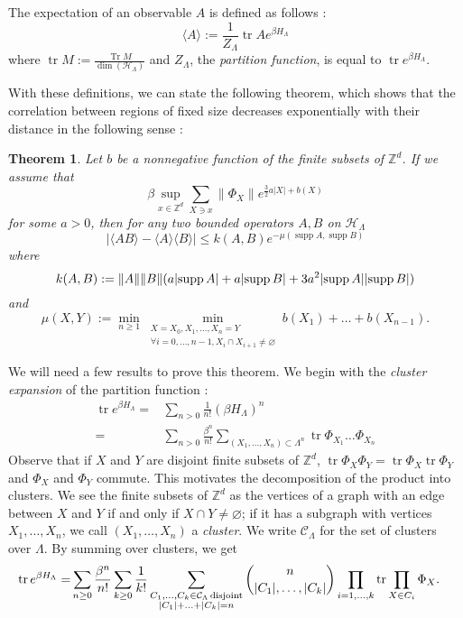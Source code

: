 \documentclass[french]{article}
\DeclarePairedDelimiter\abs{\lvert}{\rvert}
\newtheorem{thm}{Theorem}
\DeclareMathOperator{\Tr}{Tr}
\DeclareMathOperator{\disj}{disjoint}
\DeclareMathOperator{\tr}{tr}
\DeclareMathOperator{\supp}{supp}
\begin{document}
 The expectation of an observable $A$ is defined as follows :
 $$
 \langle A \rangle := \frac{1}{Z_\Lambda}\tr Ae^{\beta H_\Lambda}
 $$
 where $\tr M:=\frac{\Tr M}{\dim(\mathcal H_\Lambda)}$ and $Z_\Lambda$, the {\it partition function}, is equal to $\tr e^{\beta H_\Lambda}$.
 
 With these definitions, we can state the following theorem, which shows that the correlation between regions of fixed size decreases exponentially with their distance in the following sense :
 \begin{thm}
     \label{thm:exp_decay_of_correlations}
     Let $b$ be a nonnegative function of the finite subsets of $\mathbb Z^d$.
     If we assume that 
     $$\beta\sup_{x\in\mathbb Z^d}\sum_{X\ni x}\lVert\Phi_X\rVert e^{\frac{3}{2}a|X|+b(X)}$$ 
     for some $a>0$, then for any two bounded operators $A,B$ on $\mathcal H_\Lambda$
     $$|\langle AB\rangle - \langle A\rangle\langle B\rangle|\leq k(A,B)e^{-\mu(\supp A,\supp B)}$$
     where $$k(A,B):=\lVert A\rVert\lVert B\rVert(a\abs{\supp A}+a\abs{\supp B} + 3a^2\abs{\supp A}\abs{\supp B})$$ and 
     $$
     \mu(X,Y):= \min_{n\geq 1} \min_{\substack{X=X_0,X_1,\ldots,X_n=Y \\ \forall i=0,\ldots,n-1, X_i\cap X_{i+1}\neq \varnothing}} b(X_1)+\ldots+b(X_{n-1}).
     $$
 \end{thm}
    We will need a few results to prove this theorem.
     We begin with the {\it cluster expansion} of the partition function :
     \begin{align*}
         \tr e^{\beta H_\Lambda}=&\sum_{n>0}\frac{1}{n!}(\beta H_\Lambda)^n\\
         =&\sum_{n>0}\frac{\beta^n}{n!}\sum_{(X_1,\ldots, X_n)\subset \Lambda^n}\tr\Phi_{X_1}\ldots\Phi_{X_n}
     \end{align*}
     Observe that if $X$ and $Y$ are disjoint finite subsets of $\mathbb Z^d$, $\tr \Phi_X\Phi_Y=\tr \Phi_X \tr\Phi_Y$ and $\Phi_X$ and $\Phi_Y$ commute.
    This motivates the decomposition of the product into clusters.
    We see the finite subsets of $\mathbb Z^d$ as the vertices of a graph with an edge between $X$ and $Y$ if and only if $X\cap Y\neq \varnothing$; if it has a subgraph with vertices $X_1,\ldots,X_n$, we call $(X_1,\ldots,X_n)$ a {\it cluster}.
    We write $\mathcal C_\Lambda$ for the set of clusters over $\Lambda$.
    By summing over clusters, we get 
    \begin{align*}
        \tr e^{\beta H_\Lambda}=&\sum_{n\geq0}\frac {\beta^n} {n!} \sum_{k\geq 0}\frac{1}{k!}\sum_{\substack{C_1,\ldots,C_k\in\mathcal C_\Lambda \disj\\\abs{C_1}+\ldots+\abs{C_k}=n}}\binom{n}{\abs{C_1},\ldots,\abs{C_k}}\prod_{i=1,\ldots,k}\tr\prod_{X\in C_i}\Phi_X.
    \end{align*}
\end{document}
